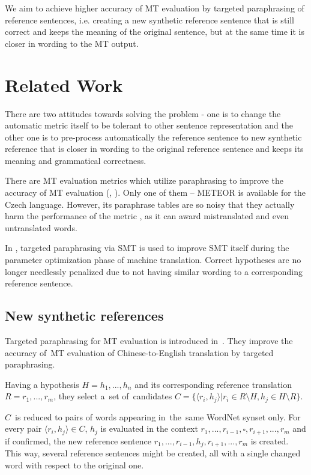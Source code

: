 \documentclass[11pt]{article}
\def \xxx#1{\textbf{\textcolor{red}{xxx: #1}}}
\begin{document}
We aim to achieve higher accuracy of MT evaluation by targeted paraphrasing 
of reference sentences, i.e. creating a new synthetic reference sentence that 
is still correct and keeps the meaning of the original sentence, but at the 
same time it is closer in wording to the MT output. 


\section{Related Work}
There are two attitudes towards solving the problem - one is to change the automatic
metric itself to be tolerant to other sentence representation and the other one is to 
pre-process automatically the reference sentence to new synthetic reference that is closer 
in wording to the original reference sentence and keeps its meaning and grammatical 
correctness.

There are MT evaluation metrics which utilize paraphrasing to improve the 
accuracy of MT evaluation (\cite{terp}, \cite{paraeval}). Only one of them -- METEOR 
\cite{meteor-wmt:2014} is available for the Czech language. However, its paraphrase 
tables are so noisy that they actually harm the performance of the metric \cite{parmesan}, 
as it can award mistranslated and even untranslated words.

In \cite{madnani:2010}, targeted paraphrasing via SMT is used to improve SMT itself 
during the parameter optimization phase of machine translation. Correct hypotheses 
are no longer needlessly penalized due to not having similar wording to a 
corresponding reference sentence. %

\subsection{New synthetic references}
Targeted paraphrasing for MT evaluation is introduced in~. They 
improve the accuracy of~MT evaluation of Chinese-to-English translation by targeted 
paraphrasing.

Having a hypothesis $ H = h_1,...,h_n $ and its corresponding reference translation 
$ R =r_1, ...,r_m $, they select a~set of~candidates 
$ C = \lbrace \langle r_i,h_j \rangle  \vert r_i \in R \setminus H, h_j \in H \setminus R \rbrace $. 
 
$ C $~is reduced to pairs of words appearing in~the~same WordNet synset only. For every pair 
$  \langle r_i,h_j \rangle \in C $, $ h_j $ is evaluated in the context $ r_1,...,r_{i-1},\square,r_{i+1},...,r_m $
and if confirmed, the new reference sentence $ r_1,...,r_{i-1},h_j,r_{i+1},...,r_m $ is created.
This way, several reference sentences might be created, all with a single changed word with respect
to the original one.
\end{document}
